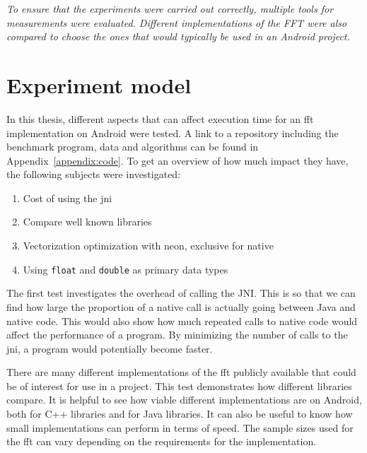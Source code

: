 \textit{To ensure that the experiments were carried out correctly, multiple tools for measurements were evaluated. Different implementations of the FFT were also compared to choose the ones that would typically be used in an Android project.}

\section{Experiment model}


In this thesis, different aspects that can affect execution time for an \gls{fft} implementation on Android were tested. A link to a repository including the benchmark program, data and algorithms can be found in Appendix~\ref{appendix:code}. To get an overview of how much impact they have, the following subjects were investigated:

\begin{enumerate}
    \item Cost of using the \gls{jni}
    \item Compare well known libraries
    \item Vectorization optimization with \gls{neon}, exclusive for native
    \item Using \texttt{float} and \texttt{double} as primary data types
\end{enumerate}

The first test investigates the overhead of calling the \gls{JNI}. This is so that we can find how large the proportion of a native call is actually going between Java and native code. This would also show how much repeated calls to native code would affect the performance of a program. By minimizing the number of calls to the \gls{jni}, a program would potentially become faster.

There are many different implementations of the \gls{fft} publicly available that could be of interest for use in a project. This test demonstrates how different libraries compare. It is helpful to see how viable different implementations are on Android, both for C++ libraries and for Java libraries. It can also be useful to know how small implementations can perform in terms of speed. The sample sizes used for the \gls{fft} can vary depending on the requirements for the implementation.

